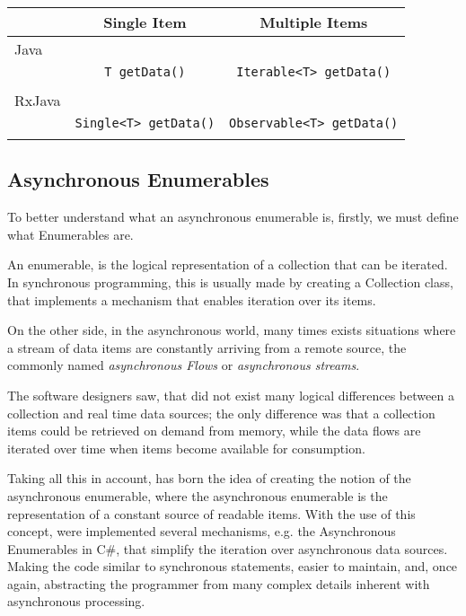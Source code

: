 \begin{center}
\begin{tabular}{ |l|c|c| }
\hline
	& Single Item & Multiple Items \\ \hline
	Java & & \\ 
& \texttt{T getData()}  & \texttt{Iterable<T> getData()} \\
	& & \\
	\hline
	RxJava & & \\ 
& \texttt{Single<T> getData()} & \texttt{Observable<T> getData()} \\
	& & \\
	\hline
\end{tabular}
\end{center}


\subsection{Asynchronous Enumerables}
	\label{sec:aenums}
	To better understand what an asynchronous enumerable is, firstly, we must define what Enumerables are. 
	
	An enumerable, is the logical representation of a collection that can be iterated. 
	In synchronous programming, this is usually made by creating a Collection class, that implements a mechanism that enables iteration over its items.
	
	On the other side, in the asynchronous world, many times exists situations where a stream of data items are constantly arriving from a remote source, the commonly named \textit{asynchronous Flows} or \textit{asynchronous streams}. 
	
	The software designers saw, that did not exist many logical differences between a collection and real time data sources; 
	the only difference was that a collection items could be retrieved on demand from memory, while the data flows are iterated over time when items become available for consumption.

	Taking all this in account, has born the idea of creating the notion of the asynchronous enumerable, where the asynchronous enumerable is the representation of a constant source of readable items.
	With the use of this concept, were implemented several mechanisms, e.g. the Asynchronous Enumerables in C\#, that simplify the iteration over asynchronous data sources. 
	Making the code similar to synchronous statements, easier to maintain, and, once again, abstracting the programmer from many complex details inherent with asynchronous processing.

